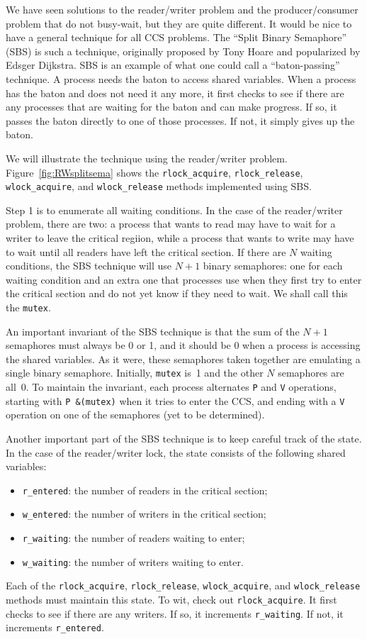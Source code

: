 \documentclass{report}
\begin{document}
We have seen solutions to the reader/writer problem and the producer/consumer
problem that do not busy-wait, but they are quite different.  It would be nice
to have a general technique for all CCS problems.
The ``Split Binary Semaphore'' (SBS) is such a technique, originally proposed by
Tony Hoare and popularized by Edsger Dijkstra.
SBS is an example of what one could call a ``baton-passing'' technique.
A process needs the baton to access shared variables.
When a process has the baton and does not need it any more,
it first checks to see if there are any processes that are waiting for the
baton and can make progress.
If so, it passes the baton directly to one of those processes.
If not, it simply gives up the baton.

We will illustrate the technique using the reader/writer problem.
Figure~\ref{fig:RWsplitsema} shows the
\texttt{rlock\_acquire}, \texttt{rlock\_release},
\texttt{wlock\_acquire}, and \texttt{wlock\_release} methods implemented using
SBS.

Step 1 is to enumerate all waiting conditions.  In the case of the reader/writer
problem, there are two: a process that wants to read may have to wait for a
writer to leave the critical regiion, while a process that wants to write may
have to wait until all readers have left the critical section.  If there are $N$
waiting conditions, the SBS technique will use $N+1$ binary semaphores: one for
each waiting condition and an extra one that processes use when they first try
to enter the critical section and do not yet know if they need to wait.
We shall call this the \texttt{mutex}.

An important invariant of the SBS technique is that the sum of the $N+1$ semaphores
must always be 0 or 1, and it should be 0 when a process is accessing the shared
variables.
As it were, these semaphores taken together are emulating a single binary semaphore.
Initially, \texttt{mutex} is~1 and the other $N$ semaphores
are all~0.  To maintain the invariant, each process alternates \texttt{P} and
\texttt{V} operations, starting with \texttt{P~\&(mutex)} when it tries to
enter the CCS, and ending with a \texttt{V} operation on one of the semaphores
(yet to be determined).

Another important part of the SBS technique is to keep careful track of the
state.  In the case of the reader/writer lock, the state consists of the
following shared variables:
\begin{itemize}
\item \texttt{r\_entered}: the number of readers in the critical section;
\item \texttt{w\_entered}: the number of writers in the critical section;
\item \texttt{r\_waiting}: the number of readers waiting to enter;
\item \texttt{w\_waiting}: the number of writers waiting to enter.
\end{itemize}
Each of the
\texttt{rlock\_acquire}, \texttt{rlock\_release},
\texttt{wlock\_acquire}, and \texttt{wlock\_release} methods must maintain
this state.
To wit, check out \texttt{rlock\_acquire}.  It first checks to see if there
are any writers.  If so, it increments \texttt{r\_waiting}.  If not,
it increments \texttt{r\_entered}.
\end{document}
